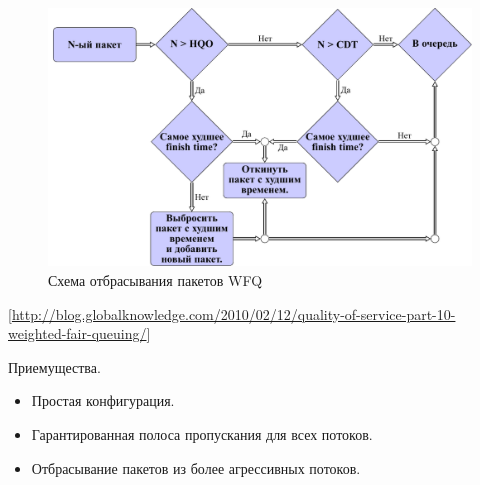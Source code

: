     \begin{figure}[ht!]
			\center
        \includegraphics{./pdfimages/fwfq_drop.pdf}
        \caption{Схема отбрасывания пакетов WFQ}
    \end{figure}
    [\url{http://blog.globalknowledge.com/2010/02/12/quality-of-service-part-10-weighted-fair-queuing/}]

     
    Приемущества.
    \begin{itemize}
        \item Простая конфигурация.
        \item Гарантированная полоса пропускания для всех потоков.
        \item Отбрасывание пакетов из более агрессивных потоков.
    \end{itemize}

